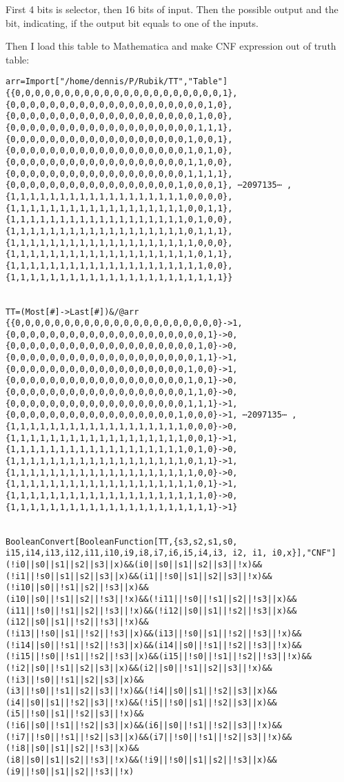 First 4 bits is selector, then 16 bits of input.
Then the possible output and the bit, indicating, if the output bit equals to one of the inputs.

Then I load this table to Mathematica and make CNF expression out of truth table:

\begin{lstlisting}[basicstyle=\small]
arr=Import["/home/dennis/P/Rubik/TT","Table"]
{{0,0,0,0,0,0,0,0,0,0,0,0,0,0,0,0,0,0,0,0,0,1},{0,0,0,0,0,0,0,0,0,0,0,0,0,0,0,0,0,0,0,0,1,0},
{0,0,0,0,0,0,0,0,0,0,0,0,0,0,0,0,0,0,0,1,0,0},
{0,0,0,0,0,0,0,0,0,0,0,0,0,0,0,0,0,0,0,1,1,1},{0,0,0,0,0,0,0,0,0,0,0,0,0,0,0,0,0,0,1,0,0,1},
{0,0,0,0,0,0,0,0,0,0,0,0,0,0,0,0,0,0,1,0,1,0},
{0,0,0,0,0,0,0,0,0,0,0,0,0,0,0,0,0,0,1,1,0,0},{0,0,0,0,0,0,0,0,0,0,0,0,0,0,0,0,0,0,1,1,1,1},
{0,0,0,0,0,0,0,0,0,0,0,0,0,0,0,0,0,1,0,0,0,1}, ⋯2097135⋯ ,
{1,1,1,1,1,1,1,1,1,1,1,1,1,1,1,1,1,1,0,0,0,0},{1,1,1,1,1,1,1,1,1,1,1,1,1,1,1,1,1,1,0,0,1,1},
{1,1,1,1,1,1,1,1,1,1,1,1,1,1,1,1,1,1,0,1,0,0},
{1,1,1,1,1,1,1,1,1,1,1,1,1,1,1,1,1,1,0,1,1,1},{1,1,1,1,1,1,1,1,1,1,1,1,1,1,1,1,1,1,1,0,0,0},
{1,1,1,1,1,1,1,1,1,1,1,1,1,1,1,1,1,1,1,0,1,1},
{1,1,1,1,1,1,1,1,1,1,1,1,1,1,1,1,1,1,1,1,0,0},{1,1,1,1,1,1,1,1,1,1,1,1,1,1,1,1,1,1,1,1,1,1}}


TT=(Most[#]->Last[#])&/@arr
{{0,0,0,0,0,0,0,0,0,0,0,0,0,0,0,0,0,0,0,0,0}->1,{0,0,0,0,0,0,0,0,0,0,0,0,0,0,0,0,0,0,0,0,1}->0,
{0,0,0,0,0,0,0,0,0,0,0,0,0,0,0,0,0,0,0,1,0}->0,
{0,0,0,0,0,0,0,0,0,0,0,0,0,0,0,0,0,0,0,1,1}->1,{0,0,0,0,0,0,0,0,0,0,0,0,0,0,0,0,0,0,1,0,0}->1,
{0,0,0,0,0,0,0,0,0,0,0,0,0,0,0,0,0,0,1,0,1}->0,
{0,0,0,0,0,0,0,0,0,0,0,0,0,0,0,0,0,0,1,1,0}->0,{0,0,0,0,0,0,0,0,0,0,0,0,0,0,0,0,0,0,1,1,1}->1,
{0,0,0,0,0,0,0,0,0,0,0,0,0,0,0,0,0,1,0,0,0}->1, ⋯2097135⋯ ,
{1,1,1,1,1,1,1,1,1,1,1,1,1,1,1,1,1,1,0,0,0}->0,{1,1,1,1,1,1,1,1,1,1,1,1,1,1,1,1,1,1,0,0,1}->1,
{1,1,1,1,1,1,1,1,1,1,1,1,1,1,1,1,1,1,0,1,0}->0,
{1,1,1,1,1,1,1,1,1,1,1,1,1,1,1,1,1,1,0,1,1}->1,{1,1,1,1,1,1,1,1,1,1,1,1,1,1,1,1,1,1,1,0,0}->0,
{1,1,1,1,1,1,1,1,1,1,1,1,1,1,1,1,1,1,1,0,1}->1,
{1,1,1,1,1,1,1,1,1,1,1,1,1,1,1,1,1,1,1,1,0}->0,{1,1,1,1,1,1,1,1,1,1,1,1,1,1,1,1,1,1,1,1,1}->1}


BooleanConvert[BooleanFunction[TT,{s3,s2,s1,s0, i15,i14,i13,i12,i11,i10,i9,i8,i7,i6,i5,i4,i3, i2, i1, i0,x}],"CNF"]
(!i0||s0||s1||s2||s3||x)&&(i0||s0||s1||s2||s3||!x)&&(!i1||!s0||s1||s2||s3||x)&&(i1||!s0||s1||s2||s3||!x)&&(!i10||s0||!s1||s2||!s3||x)&&
(i10||s0||!s1||s2||!s3||!x)&&(!i11||!s0||!s1||s2||!s3||x)&&(i11||!s0||!s1||s2||!s3||!x)&&(!i12||s0||s1||!s2||!s3||x)&&(i12||s0||s1||!s2||!s3||!x)&&
(!i13||!s0||s1||!s2||!s3||x)&&(i13||!s0||s1||!s2||!s3||!x)&&(!i14||s0||!s1||!s2||!s3||x)&&(i14||s0||!s1||!s2||!s3||!x)&&
(!i15||!s0||!s1||!s2||!s3||x)&&(i15||!s0||!s1||!s2||!s3||!x)&&(!i2||s0||!s1||s2||s3||x)&&(i2||s0||!s1||s2||s3||!x)&&(!i3||!s0||!s1||s2||s3||x)&&
(i3||!s0||!s1||s2||s3||!x)&&(!i4||s0||s1||!s2||s3||x)&&(i4||s0||s1||!s2||s3||!x)&&(!i5||!s0||s1||!s2||s3||x)&&(i5||!s0||s1||!s2||s3||!x)&&
(!i6||s0||!s1||!s2||s3||x)&&(i6||s0||!s1||!s2||s3||!x)&&(!i7||!s0||!s1||!s2||s3||x)&&(i7||!s0||!s1||!s2||s3||!x)&&(!i8||s0||s1||s2||!s3||x)&&
(i8||s0||s1||s2||!s3||!x)&&(!i9||!s0||s1||s2||!s3||x)&&(i9||!s0||s1||s2||!s3||!x)
\end{lstlisting}

